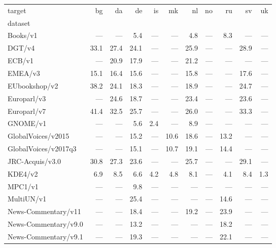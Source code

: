 \begin{table}[h]
\begin{tabular}{lrrrrrrrrrr}
\toprule
target &   bg &   da &   de &   is &   mk &   nl &   no &   ru &   sv &   uk \\
dataset              &      &      &      &      &      &      &      &      &      &      \\
\midrule
Books/v1             &  --- &  --- &  5.4 &  --- &  --- &  4.8 &  --- &  8.3 &  --- &  --- \\
DGT/v4               & 33.1 & 27.4 & 24.1 &  --- &  --- & 25.9 &  --- &  --- & 28.9 &  --- \\
ECB/v1               &  --- & 20.9 & 17.9 &  --- &  --- & 21.2 &  --- &  --- &  --- &  --- \\
EMEA/v3              & 15.1 & 16.4 & 15.6 &  --- &  --- & 15.8 &  --- &  --- & 17.6 &  --- \\
EUbookshop/v2        & 38.2 & 24.1 & 18.3 &  --- &  --- & 18.9 &  --- &  --- & 24.7 &  --- \\
Europarl/v3          &  --- & 24.6 & 18.7 &  --- &  --- & 23.4 &  --- &  --- & 23.6 &  --- \\
Europarl/v7          & 41.4 & 32.5 & 25.7 &  --- &  --- & 26.0 &  --- &  --- & 33.3 &  --- \\
GNOME/v1             &  --- &  --- &  5.6 &  2.4 &  --- &  8.9 &  --- &  --- &  --- &  --- \\
GlobalVoices/v2015   &  --- &  --- & 15.2 &  --- & 10.6 & 18.6 &  --- & 13.2 &  --- &  --- \\
GlobalVoices/v2017q3 &  --- &  --- & 15.1 &  --- & 10.7 & 19.1 &  --- & 14.4 &  --- &  --- \\
JRC-Acquis/v3.0      & 30.8 & 27.3 & 23.6 &  --- &  --- & 25.7 &  --- &  --- & 29.1 &  --- \\
KDE4/v2              &  6.9 &  8.5 &  6.6 &  4.2 &  4.8 &  8.1 &  --- &  4.1 &  8.4 &  1.3 \\
MPC1/v1              &  --- &  --- &  9.8 &  --- &  --- &  --- &  --- &  --- &  --- &  --- \\
MultiUN/v1           &  --- &  --- & 25.4 &  --- &  --- &  --- &  --- & 14.6 &  --- &  --- \\
News-Commentary/v11  &  --- &  --- & 18.4 &  --- &  --- & 19.2 &  --- & 23.9 &  --- &  --- \\
News-Commentary/v9.0 &  --- &  --- & 13.2 &  --- &  --- &  --- &  --- & 18.2 &  --- &  --- \\
News-Commentary/v9.1 &  --- &  --- & 19.3 &  --- &  --- &  --- &  --- & 22.1 &  --- &  --- \\

\end{tabular}
\end{table}
